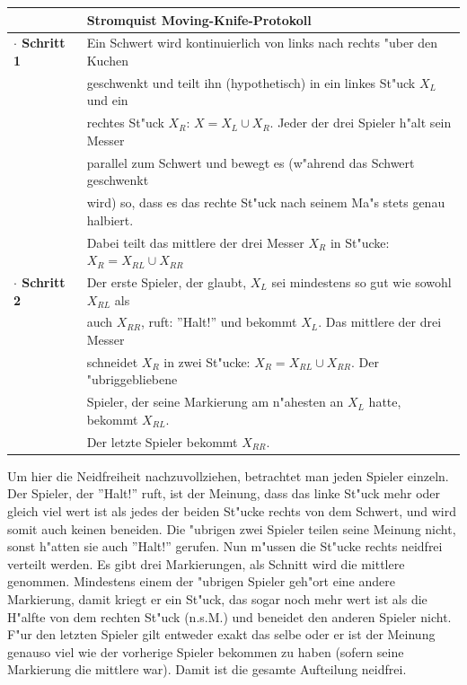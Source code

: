 \documentclass[11pt, a4paper, twoside]{article}
\numberwithin{equation}{section}
\begin{document}
\begin{tabular}{|ll|}
\hline
&\textbf{Stromquist Moving-Knife-Protokoll}\\
\hline
\textbf{$\cdot$ Schritt 1}& Ein Schwert wird kontinuierlich von links nach rechts "uber den Kuchen\\&geschwenkt und teilt ihn (hypothetisch) in ein linkes St"uck $X_L$ und ein\\&rechtes St"uck $X_R$: $X=X_L\cup X_R$. Jeder der drei Spieler h"alt sein Messer\\&parallel zum Schwert und bewegt es (w"ahrend das Schwert geschwenkt\\&wird) so, dass es das rechte St"uck nach seinem Ma"s stets genau halbiert.\\&Dabei teilt das mittlere der drei Messer $X_R$ in St"ucke:$X_R=X_{RL}\cup X_{RR}$\\
\textbf{$\cdot$ Schritt 2}& Der erste Spieler, der glaubt, $X_L$ sei mindestens so gut wie sowohl $X_{RL}$ als\\&auch $ X_{RR}$, ruft: ''Halt!'' und bekommt $X_L$. Das mittlere der drei Messer\\&schneidet $X_R$ in zwei St"ucke: $X_R=X_{RL}\cup X_{RR}$. Der "ubriggebliebene\\& Spieler, der seine Markierung am n"ahesten an $X_L$ hatte, bekommt $X_{RL}$.\\&Der letzte Spieler bekommt $X_{RR}$.\\     
\hline
\end{tabular}
\newline
\newline
\newline
Um hier die Neidfreiheit nachzuvollziehen, betrachtet man jeden Spieler einzeln. Der Spieler, der ''Halt!'' ruft, ist der Meinung, dass das linke St"uck mehr oder gleich viel wert ist als jedes der beiden St"ucke rechts von dem Schwert, und wird somit auch keinen beneiden. Die "ubrigen zwei Spieler teilen seine Meinung nicht, sonst h"atten sie auch ''Halt!'' gerufen. Nun m"ussen die St"ucke rechts neidfrei verteilt werden. Es gibt drei Markierungen, als Schnitt wird die mittlere genommen. Mindestens einem der "ubrigen Spieler geh"ort eine andere Markierung, damit kriegt er ein St"uck, das sogar noch mehr wert ist als die H"alfte von dem rechten St"uck (n.s.M.) und beneidet den anderen Spieler nicht. F"ur den letzten Spieler gilt entweder exakt das selbe oder er ist der Meinung genauso viel wie der vorherige Spieler bekommen zu haben (sofern seine Markierung die mittlere war). Damit ist die gesamte Aufteilung neidfrei.\\
\end{document}
